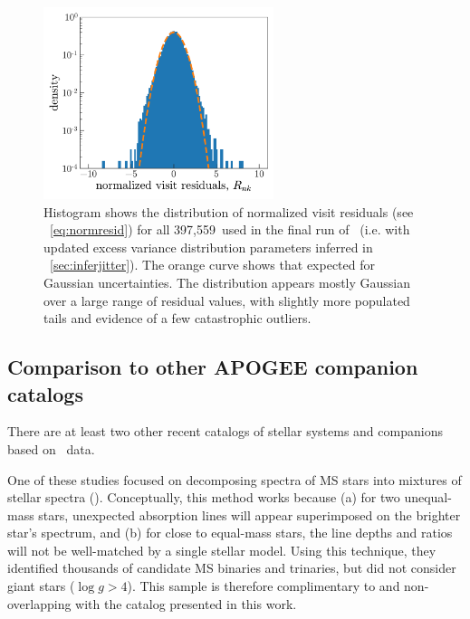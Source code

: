 \documentclass[modern, letterpaper]{aastex62}
\newcommand{\apogee}{\project{\acronym{APOGEE}}}
\newcommand{\thejoker}{\project{The~Joker}}
\newcommand{\logg}{\ensuremath{\log g}}
\newcommand{\nvisits}{397,559}
\begin{document}
\begin{figure}[h]
\begin{center}
\includegraphics[width=0.6\textwidth]{residuals}
\end{center}
\caption{%
Histogram shows the distribution of normalized visit residuals (see
\eqname~\ref{eq:normresid}) for all \nvisits\ used in the final run of
\thejoker\ (i.e. with updated excess variance distribution parameters inferred
in \sectionname~\ref{sec:inferjitter}).
The orange curve shows that expected for Gaussian uncertainties.
The distribution appears mostly Gaussian over a large range of residual values,
with slightly more populated tails and evidence of a few catastrophic outliers.
\label{fig:residuals}
}
\end{figure}


\subsection{Comparison to other APOGEE companion catalogs}
\label{sec:compare-troup}

There are at least two other recent catalogs of stellar systems and companions
based on \apogee\ data.

One of these studies focused on decomposing spectra of MS stars into mixtures of
stellar spectra (\citealt{El-Badry:2018}).
Conceptually, this method works because (a) for two unequal-mass stars,
unexpected absorption lines will appear superimposed on the brighter star's
spectrum, and (b) for close to equal-mass stars, the line depths and ratios will
not be well-matched by a single stellar model.
Using this technique, they identified thousands of candidate MS binaries and
trinaries, but did not consider giant stars ($\logg > 4$).
This sample is therefore complimentary to and non-overlapping with the catalog
presented in this work.
\end{document}
